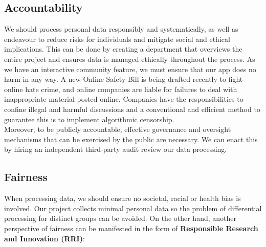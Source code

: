 \subsection{Accountability} 
We should process personal data responsibly and systematically, as well as endeavour to reduce risks for individuals and mitigate social and ethical implications. 
This can be done by creating a department that overviews the entire project and ensures data is managed ethically throughout the process. As we have an interactive community 
feature, we must ensure that our app does no harm in any way. A new Online Safety Bill is being drafted recently to fight online hate crime, and online companies are liable for failures to
deal with inappropriate material posted online.  Companies have the responsibilities to confine illegal and harmful discussions and a conventional and efficient method
to guarantee this is to implement algorithmic censorship. \\Moreover, to be publicly accountable, effective governance and oversight mechanisms that can be exercised by the public are necessary. 
We can enact this by hiring an independent third-party audit review our data processing.

\subsection{Fairness}
When processing data, we should ensure no societal, racial or health bias is involved. Our project collects minimal personal data so the problem of differential processing for distinct groups can be avoided. 
On the other hand, another perspective of fairness can be manifested in the form of \textbf{Responsible Research and Innovation (RRI)}:

